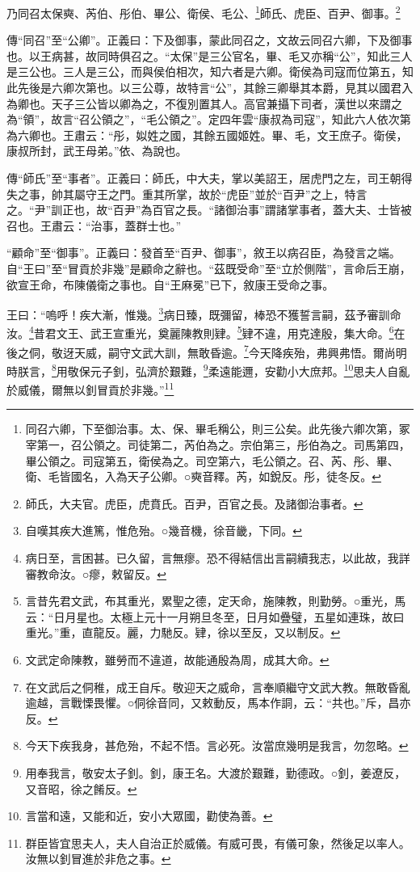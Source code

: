 乃同召太保奭、芮伯、彤伯、畢公、衛侯、毛公、\footnote{同召六卿，下至御治事。太、保、畢毛稱公，則三公矣。此先後六卿次第，冢宰第一，召公領之。司徒第二，芮伯為之。宗伯第三，彤伯為之。司馬第四，畢公領之。司寇第五，衛侯為之。司空第六，毛公領之。召、芮、彤、畢、衛、毛皆國名，入為天子公卿。○奭音釋。芮，如銳反。彤，徒冬反。}師氏、虎臣、百尹、御事。\footnote{師氏，大夫官。虎臣，虎賁氏。百尹，百官之長。及諸御治事者。}

{\noindent\zhuan{}\fzbyks 傳“同召”至“公卿”。正義曰：下及御事，蒙此同召之，文故云同召六卿，下及御事也。以王病甚，故同時俱召之。“太保”是三公官名，畢、毛又亦稱“公”，知此三人是三公也。三人是三公，而與侯伯相次，知六者是六卿。衛侯為司寇而位第五，知此先後是六卿次第也。以三公尊，故特言“公”，其餘三卿舉其本爵，見其以國君入為卿也。天子三公皆以卿為之，不復別置其人。高官兼攝下司者，漢世以來謂之為“領”，故言“召公領之”，“毛公領之”。定四年雲“康叔為司寇”，知此六人依次第為六卿也。王肅云：“彤，姒姓之國，其餘五國姬姓。畢、毛，文王庶子。衛侯，康叔所封，武王母弟。”依、為說也。 \par}

{\noindent\zhuan{}\fzbyks 傳“師氏”至“事者”。正義曰：師氏，中大夫，掌以美詔王，居虎門之左，司王朝得失之事，帥其屬守王之門。重其所掌，故於“虎臣”並於“百尹”之上，特言之。“尹”訓正也，故“百尹”為百官之長。“諸御治事”謂諸掌事者，蓋大夫、士皆被召也。王肅云：“治事，蓋群士也。” \par}

{\noindent\shu{}\fzkt “顧命”至“御事”。正義曰：發首至“百尹、御事”，敘王以病召臣，為發言之端。自“王曰”至“冒貢於非幾”是顧命之辭也。“茲既受命”至“立於側階”，言命后王崩，欲宣王命，布陳儀衛之事也。自“王麻冕”已下，敘康王受命之事。 \par}

王曰：“嗚呼！疾大漸，惟幾。\footnote{自嘆其疾大進篤，惟危殆。○幾音機，徐音畿，下同。}病日臻，既彌留，棒恐不獲誓言嗣，茲予審訓命汝。\footnote{病日至，言困甚。已久留，言無瘳。恐不得結信出言嗣續我志，以此故，我詳審教命汝。○瘳，敕留反。}昔君文王、武王宣重光，奠麗陳教則肄。\footnote{言昔先君文武，布其重光，累聖之德，定天命，施陳教，則勤勞。○重光，馬云：“日月星也。太極上元十一月朔旦冬至，日月如疊璧，五星如連珠，故曰重光。”重，直龍反。麗，力馳反。肄，徐以至反，又以制反。}肄不違，用克達殷，集大命。\footnote{文武定命陳教，雖勞而不違道，故能通殷為周，成其大命。}在後之侗，敬迓天威，嗣守文武大訓，無敢昏逾。\footnote{在文武后之侗稚，成王自斥。敬迎天之威命，言奉順繼守文武大教。無敢昏亂逾越，言戰慄畏懼。○侗徐音同，又敕動反，馬本作詷，云：“共也。”斥，昌亦反。}今天降疾殆，弗興弗悟。爾尚明時朕言，\footnote{今天下疾我身，甚危殆，不起不悟。言必死。汝當庶幾明是我言，勿忽略。}用敬保元子釗，弘濟於艱難，\footnote{用奉我言，敬安太子釗。釗，康王名。大渡於艱難，勤德政。○釗，姜遼反，又音昭，徐之餚反。}柔遠能邇，安勸小大庶邦。\footnote{言當和遠，又能和近，安小大眾國，勸使為善。}思夫人自亂於威儀，爾無以釗冒貢於非幾。”\footnote{群臣皆宜思夫人，夫人自治正於威儀。有威可畏，有儀可象，然後足以率人。汝無以釗冒進於非危之事。}


